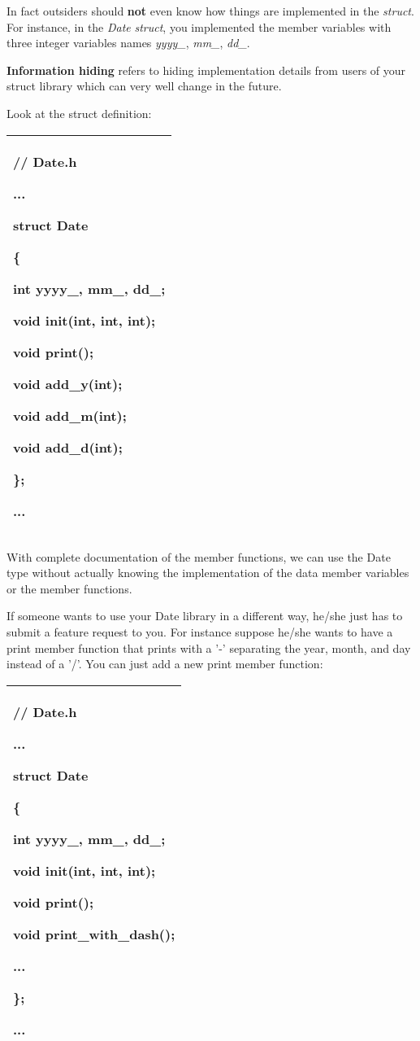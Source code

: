 \documentclass[
]{article}
\begin{document}
In fact outsiders should \textbf{not} even know how things are
implemented in the \emph{struct}. For instance, in the \emph{Date}
\emph{struct}, you implemented the member variables with three integer
variables names \emph{yyyy\_}, \emph{mm\_}, \emph{dd\_}.

\hfill\break
\textbf{Information hiding} refers to hiding implementation details from
users of your struct library which can very well change in the future.

Look at the struct definition:

\begin{longtable}[]{@{}l@{}}
\toprule
\endhead
\begin{minipage}[t]{0.97\columnwidth}\raggedright
// Date.h

...

struct Date

\{

int yyyy\_, mm\_, dd\_;

void init(int, int, int);

void print();

void add\_y(int);

void add\_m(int);

void add\_d(int);

\};

...\strut
\end{minipage}\tabularnewline
\bottomrule
\end{longtable}

With complete documentation of the member functions, we can use the Date
type without actually knowing the implementation of the data member
variables or the member functions.

If someone wants to use your Date library in a different way, he/she
just has to submit a feature request to you. For instance suppose he/she
wants to have a print member function that prints with a '-' separating
the year, month, and day instead of a '/'. You can just add a new print
member function:

\begin{longtable}[]{@{}l@{}}
\toprule
\endhead
\begin{minipage}[t]{0.97\columnwidth}\raggedright
// Date.h

...

struct Date

\{

int yyyy\_, mm\_, dd\_;

void init(int, int, int);

void print();

void print\_with\_dash();

...

\};

...\strut
\end{minipage}\tabularnewline
\bottomrule
\end{longtable}
\end{document}
